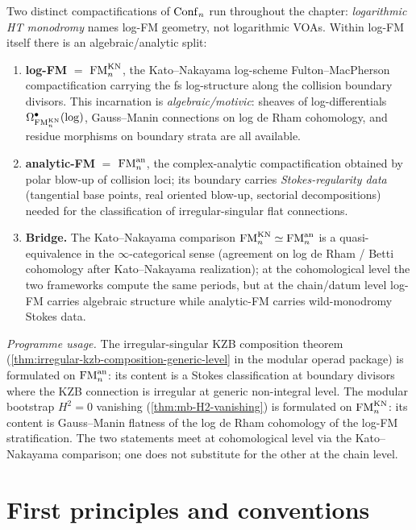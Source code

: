 \begin{remark}\label{rem:log-geometric-vs-analytic-FM}
Two distinct compactifications of $\mathrm{Conf}_n$ run throughout the chapter: \emph{logarithmic HT monodromy} names log-FM geometry, not logarithmic VOAs. Within log-FM itself there is an algebraic/analytic split:
\begin{enumerate}[label=\textup{(\alph*)}]
 \item \textbf{log-FM} $=$ $\mathrm{FM}_n^{\mathrm{KN}}$, the Kato--Nakayama log-scheme Fulton--MacPherson compactification carrying the fs log-structure along the collision boundary divisors. This incarnation is \emph{algebraic/motivic}: sheaves of log-differentials $\Omega^\bullet_{\mathrm{FM}_n^{\mathrm{KN}}}(\log)$, Gauss--Manin connections on log de Rham cohomology, and residue morphisms on boundary strata are all available.
 \item \textbf{analytic-FM} $=$ $\mathrm{FM}_n^{\mathrm{an}}$, the complex-analytic compactification obtained by polar blow-up of collision loci; its boundary carries \emph{Stokes-regularity data} (tangential base points, real oriented blow-up, sectorial decompositions) needed for the classification of irregular-singular flat connections.
 \item \textbf{Bridge.} The Kato--Nakayama comparison $\mathrm{FM}_n^{\mathrm{KN}} \simeq \mathrm{FM}_n^{\mathrm{an}}$ is a quasi-equivalence in the $\infty$-categorical sense (agreement on log de Rham / Betti cohomology after Kato--Nakayama realization); at the cohomological level the two frameworks compute the same periods, but at the chain/datum level log-FM carries algebraic structure while analytic-FM carries wild-monodromy Stokes data.
\end{enumerate}
\emph{Programme usage.} The irregular-singular KZB composition theorem (\cref{thm:irregular-kzb-composition-generic-level} in the modular operad package) is formulated on $\mathrm{FM}_n^{\mathrm{an}}$: its content is a Stokes classification at boundary divisors where the KZB connection is irregular at generic non-integral level. The modular bootstrap $H^2=0$ vanishing (\cref{thm:mb-H2-vanishing}) is formulated on $\mathrm{FM}_n^{\mathrm{KN}}$: its content is Gauss--Manin flatness of the log de Rham cohomology of the log-FM stratification. The two statements meet at cohomological level via the Kato--Nakayama comparison; one does not substitute for the other at the chain level.
\end{remark}

\section{First principles and conventions}\label{sec:log-ht-foundations}

